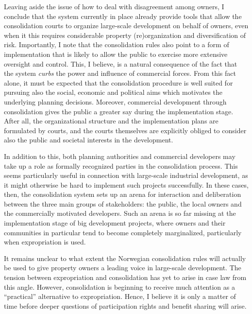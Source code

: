
Leaving aside the issue of how to deal with disagreement among owners, I conclude that the system currently in place already provide tools that allow the consolidation courts to organize large-scale development on behalf of owners, even when it this requires considerable property (re)organization and diversification of risk. Importantly, I note that the consolidation rules also point to a form of implementation that is likely to allow the public to exercise more extensive oversight and control. This, I believe, is a natural consequence of the fact that the system \emph{curbs} the power and influence of commercial forces. From this fact alone, it must be expected that the consolidation procedure is well suited for pursuing also the social, economic and political aims which motivates the underlying planning decisions. Moreover, commercial development through consolidation gives the public a greater say during the implementation stage. After all, the organizational structure and the implementation plans are formulated by courts, and the courts themselves are explicitly obliged to consider also the public and societal interests in the development.

In addition to this, both planning authorities and commercial developers may take up a role as formally recognized parties in the consolidation process. This seems particularly useful in connection with large-scale industrial development, as it might otherwise be hard to implement such projects successfully. In these cases, then, the consolidation system sets up an arena for interaction and deliberation between the three main groups of stakeholders: the public, the local owners and the commercially motivated developers. Such an arena is so far missing at the implementation stage of big development projects, where owners and their communities in particular tend to become completely marginalized, particularly when expropriation is used.

It remains unclear to what extent the Norwegian consolidation rules will actually be used to give property owners a leading voice in large-scale development. The tension between expropriation and consolidation has yet to arise in case law from this angle. However, consolidation is beginning to receive much attention as a ``practical'' alternative to expropriation. Hence, I believe it is only a matter of time before deeper questions of participation rights and benefit sharing will arise.

